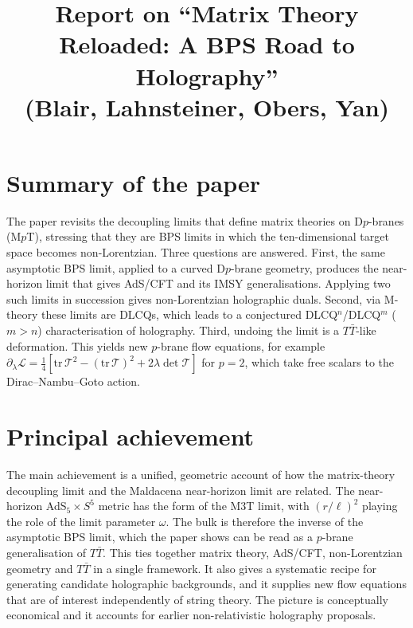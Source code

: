 \documentclass[11pt]{article}
\title{Report on ``Matrix Theory Reloaded: A BPS Road to Holography''\\(Blair, Lahnsteiner, Obers, Yan)}
\date{}
\begin{document}
\maketitle

\section*{Summary of the paper}
The paper revisits the decoupling limits that define matrix theories on D$p$-branes (M$p$T), stressing that they are BPS limits in which the ten-dimensional target space becomes non-Lorentzian. Three questions are answered. First, the same asymptotic BPS limit, applied to a curved D$p$-brane geometry, produces the near-horizon limit that gives AdS/CFT and its IMSY generalisations. Applying two such limits in succession gives non-Lorentzian holographic duals. Second, via M-theory these limits are DLCQs, which leads to a conjectured DLCQ$^n$/DLCQ$^m$ ($m>n$) characterisation of holography. Third, undoing the limit is a $T\bar T$-like deformation. This yields new $p$-brane flow equations, for example $\partial_\lambda\mathcal L=\tfrac14[\mathrm{tr}\,\mathcal T^2-(\mathrm{tr}\,\mathcal T)^2+2\lambda\det\mathcal T]$ for $p=2$, which take free scalars to the Dirac--Nambu--Goto action.

\section{Principal achievement}
The main achievement is a unified, geometric account of how the matrix-theory decoupling limit and the Maldacena near-horizon limit are related. The near-horizon AdS$_5\times S^5$ metric has the form of the M3T limit, with $(r/\ell)^2$ playing the role of the limit parameter $\omega$. The bulk is therefore the inverse of the asymptotic BPS limit, which the paper shows can be read as a $p$-brane generalisation of $T\bar T$. This ties together matrix theory, AdS/CFT, non-Lorentzian geometry and $T\bar T$ in a single framework. It also gives a systematic recipe for generating candidate holographic backgrounds, and it supplies new flow equations that are of interest independently of string theory. The picture is conceptually economical and it accounts for earlier non-relativistic holography proposals.
\end{document}

